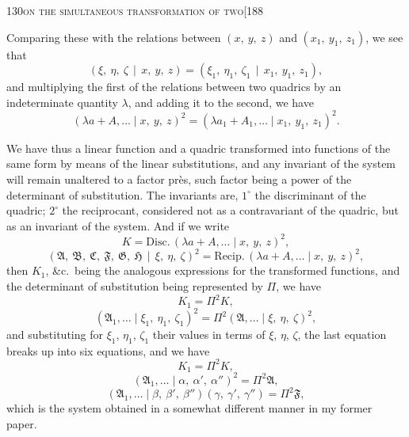 \documentclass[11pt]{article}
\begin{document}
\newpage

\begin{center}
\small 130\hfill\textsc{on the simultaneous transformation of two}\hfill[188
\end{center}

\medskip

\noindent Comparing these with the relations between $(x,\ y,\ z)$ and $(x_{1},\ y_{1},\ z_{1})$, we see that
\[
(\xi,\ \eta,\ \zeta\,\mid\, x,\ y,\ z) = (\xi_{1},\ \eta_{1},\ \zeta_{1}\,\mid\, x_{1},\ y_{1},\ z_{1}),
\]
and multiplying the first of the relations between two quadrics by an indeterminate quantity $\lambda$, and adding it to the second, we have
\[
(\lambda a + A,\ldots \mid x,\ y,\ z)^{2} = (\lambda a_{1} + A_{1},\ldots \mid x_{1},\ y_{1},\ z_{1})^{2}.
\]

We have thus a linear function and a quadric transformed into functions of the same form by means of the linear substitutions, and any invariant of the system will remain unaltered to a factor pr\`es, such factor being a power of the determinant of substitution. The invariants are, $1^{\circ}$ the discriminant of the quadric; $2^{\circ}$ the reciprocant, considered not as a contravariant of the quadric, but as an invariant of the system. And if we write
\[
K = \mathrm{Disc.}\,(\lambda a + A,\ldots \mid x,\ y,\ z)^{2},
\]
\[
(\mathfrak{A},\ \mathfrak{B},\ \mathfrak{C},\ \mathfrak{F},\ \mathfrak{G},\ \mathfrak{H}\,\mid\,\xi,\ \eta,\ \zeta)^{2} = \mathrm{Recip.}\,(\lambda a + A,\ldots \mid x,\ y,\ z)^{2},
\]
then $K_{1}$, \&c.\ being the analogous expressions for the transformed functions, and the determinant of substitution being represented by $\Pi$, we have
\[
K_{1} = \Pi^{2} K,
\]
\[
(\mathfrak{A}_{1},\ldots \mid \xi_{1},\ \eta_{1},\ \zeta_{1})^{2} = \Pi^{2} (\mathfrak{A},\ldots \mid \xi,\ \eta,\ \zeta)^{2},
\]
and substituting for $\xi_{1}$, $\eta_{1}$, $\zeta_{1}$ their values in terms of $\xi$, $\eta$, $\zeta$, the last equation breaks up into six equations, and we have
\[
K_{1} = \Pi^{2} K,
\]
\[
(\mathfrak{A}_{1},\ldots \mid \alpha,\ \alpha',\ \alpha'')^{2} = \Pi^{2} \mathfrak{A},
\]
\[
(\mathfrak{A}_{1},\ldots \mid \beta,\ \beta',\ \beta'')(\gamma,\ \gamma',\ \gamma'') = \Pi^{2} \mathfrak{F},
\]
which is the system obtained in a somewhat different manner in my former paper.
\end{document}
